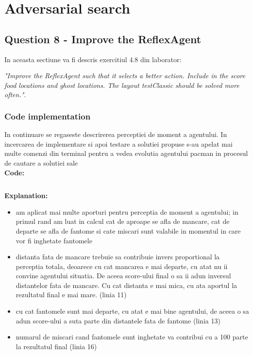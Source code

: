 \section{Adversarial search}

\subsection{Question 8 - Improve the ReflexAgent}
In aceasta sectiune va fi descris exercitiul 4.8 din laborator: \newline

\textit{"Improve the ReflexAgent such that it selects a better action. Include in the score food locations and ghost locations. The layout testClassic should be solved more often."}.


\subsubsection{Code implementation}
In continuare se regaseste descrirerea perceptiei de moment a agentului. In incercarea de implementare si apoi testare a solutiei propuse s-au apelat mai multe comenzi din terminal pentru a vedea evolutia agentului pacman in procesul de cautare a solutiei sale \newline \\


\textbf{Code:}

\inputminted[linenos]{python}{code/08_reflex_agent.py}


\textbf{Explanation:}
\begin{itemize}
    \setlength\itemsep{0em}
    \item am aplicat mai multe aporturi pentru perceptia de moment a agentului; in primul rand am luat in calcul cat de aproape se afla de mancare, cat de departe se afla de fantome si cate miscari sunt valabile in momentul in care vor fi inghetate fantomele
    \item distanta fata de mancare trebuie sa contribuie invers proportional la perceptia totala, deoarece cu cat mancarea e mai departe, cu atat nu ii convine agentului situatia. De aceea score-ului final o sa ii adun inversul distantelor fata de mancare. Cu cat distanta e mai mica, cu ata aportul la rezultatul final e mai mare. (linia 11)
    \item cu cat fantomele sunt mai departe, cu atat e mai bine agentului, de aceea o sa adun score-ului a suta parte din distantele fata de fantome (linia 13)
    \item numarul de miscari cand fantomele sunt inghetate va contribui cu a 100 parte la rezultatul final (linia 16)
    

\end{itemize}


